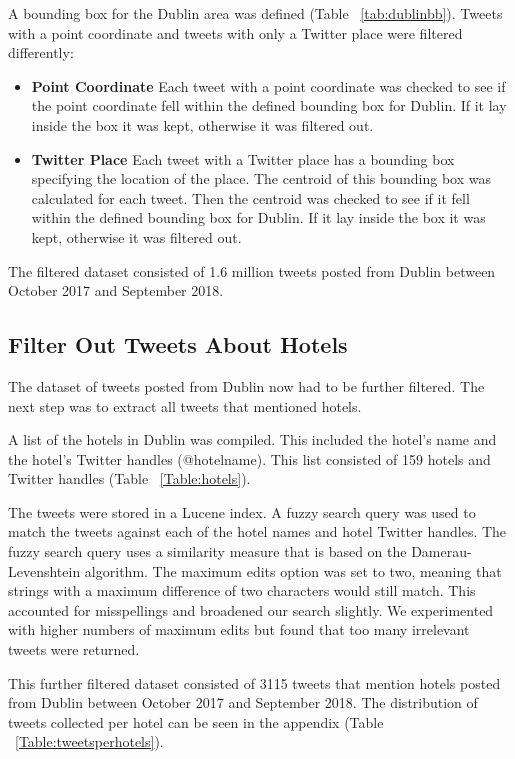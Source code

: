 A bounding box for the Dublin area was defined (Table ~\ref{tab:dublinbb}). Tweets with a point coordinate and tweets with only a Twitter place were filtered differently:
\begin{itemize}
    \item \textbf{Point Coordinate}\newline
    Each tweet with a point coordinate was checked to see if the point coordinate fell within the defined bounding box for Dublin. If it lay inside the box it was kept, otherwise it was filtered out.
    \item \textbf{Twitter Place}\newline
    Each tweet with a Twitter place has a bounding box specifying the location of the place. The centroid of this bounding box was calculated for each tweet. Then the centroid was checked to see if it fell within the defined bounding box for Dublin. If it lay inside the box it was kept, otherwise it was filtered out.
\end{itemize}

The filtered dataset consisted of 1.6 million tweets posted from Dublin between October 2017 and September 2018.

\subsection*{Filter Out Tweets About Hotels}

The dataset of tweets posted from Dublin now had to be further filtered. The next step was to extract all tweets that mentioned hotels.

A list of the hotels in Dublin was compiled. This included the hotel's name and the hotel's Twitter handles (@hotelname). This list consisted of 159 hotels and Twitter handles (Table ~\ref{Table:hotels}).

The tweets were stored in a Lucene index. A fuzzy search query was used to match the tweets against each of the hotel names and hotel Twitter handles. The fuzzy search query uses a similarity measure that is based on the Damerau-Levenshtein algorithm. The maximum edits option was set to two, meaning that strings with a maximum difference of two characters would still match. This accounted for misspellings and broadened our search slightly. We experimented with higher numbers of maximum edits but found that too many irrelevant tweets were returned.

This further filtered dataset consisted of 3115 tweets that mention hotels posted from Dublin between October 2017 and September 2018. The distribution of tweets collected per hotel can be seen in the appendix (Table ~\ref{Table:tweetsperhotels}).

